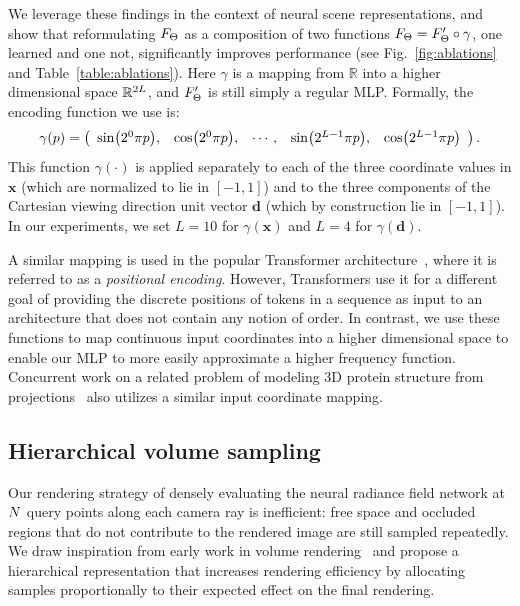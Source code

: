 \documentclass[runningheads]{llncs}
\begin{document}
We leverage these findings in the context of neural scene representations, and show that reformulating $F_{\mathrm{\Theta}}$ as a composition of two functions ${F_{\mathrm{\Theta}} = F'_{\mathrm{\Theta}} \circ \gamma }$, one learned and one not, significantly improves performance (see Fig.~\ref{fig:ablations} and Table~\ref{table:ablations}).
Here $\gamma$ is a mapping from $\mathbb{R}$ into a higher dimensional space $\mathbb{R}^{2L}$, and $F'_{\mathrm{\Theta}}$ is still simply a regular MLP. Formally, the encoding function we use is: 
\begin{equation}
    \gamma(\dummypos) = \left(
    \begin{array}{ccccc}
    \sin\left(2^0 \pi \dummypos\right), &
    \cos\left(2^0 \pi \dummypos\right), &
    \cdots, &
    \sin\left(2^{\numfrequencies-1} \pi \dummypos\right), &
    \cos\left(2^{\numfrequencies-1} \pi \dummypos\right)
    \end{array} \right) \,.
\label{eq:enc}
\end{equation}
This function $\gamma(\cdot)$ is applied separately to each of the three coordinate values in $\mathbf{x}$ (which are normalized to lie in $[-1, 1]$) and to the three components of the Cartesian viewing direction unit vector $\mathbf{d}$ (which by construction lie in $[-1, 1]$). 
In our experiments, we set $L=10$ for $\gamma(\mathbf x)$ and $L=4$ for $\gamma(\mathbf d)$. 

A similar mapping is used in the popular Transformer architecture~\cite{transformer}, where it is referred to as a \emph{positional encoding}. However, Transformers use it for a different goal of providing the discrete positions of tokens in a sequence as input to an architecture that does not contain any notion of order. In contrast, we use these functions to map continuous input coordinates into a higher dimensional space to enable our MLP to more easily approximate a higher frequency function. Concurrent work on a related problem of modeling 3D protein structure from projections~\cite{cryoem} also utilizes a similar input coordinate mapping.

\subsection{Hierarchical volume sampling}
\label{sec:hierarchical}

Our rendering strategy of densely evaluating the neural radiance field network at $N$ query points along each camera ray is inefficient: free space and occluded regions that do not contribute to the rendered image are still sampled repeatedly.
We draw inspiration from early work in volume rendering~\cite{levoy90} and propose a hierarchical representation that increases rendering efficiency by allocating samples proportionally to their expected effect on the final rendering.
\end{document}
